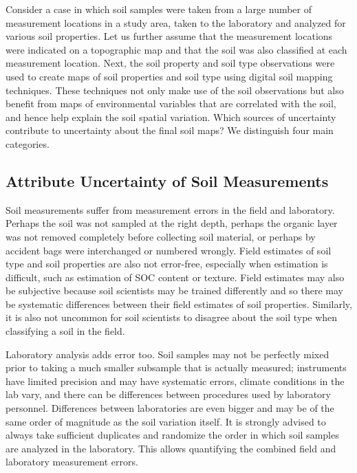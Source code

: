 \documentclass[10pt,b5paper,]{book}
\theoremstyle{definition}
\theoremstyle{definition}
\theoremstyle{definition}
\theoremstyle{remark}
\begin{document}
Consider a case in which soil samples were taken from a large number of
measurement locations in a study area, taken to the laboratory and
analyzed for various soil properties. Let us further assume that the
measurement locations were indicated on a topographic map and that the
soil was also classified at each measurement location. Next, the soil
property and soil type observations were used to create maps of soil
properties and soil type using digital soil mapping techniques. These
techniques not only make use of the soil observations but also benefit
from maps of environmental variables that are correlated with the soil,
and hence help explain the soil spatial variation. Which sources of
uncertainty contribute to uncertainty about the final soil maps? We
distinguish four main categories.

\hypertarget{attribute-uncertainty-of-soil-measurements}{%
\subsection{Attribute Uncertainty of Soil
Measurements}\label{attribute-uncertainty-of-soil-measurements}}

Soil measurements suffer from measurement errors in the field and
laboratory. Perhaps the soil was not sampled at the right depth, perhaps
the organic layer was not removed completely before collecting soil
material, or perhaps by accident bags were interchanged or numbered
wrongly. Field estimates of soil type and soil properties are also not
error-free, especially when estimation is difficult, such as estimation
of SOC content or texture. Field estimates may also be subjective
because soil scientists may be trained differently and so there may be
systematic differences between their field estimates of soil properties.
Similarly, it is also not uncommon for soil scientists to disagree about
the soil type when classifying a soil in the field.

Laboratory analysis adds error too. Soil samples may not be perfectly
mixed prior to taking a much smaller subsample that is actually
measured; instruments have limited precision and may have systematic
errors, climate conditions in the lab vary, and there can be differences
between procedures used by laboratory personnel. Differences between
laboratories are even bigger and may be of the same order of magnitude
as the soil variation itself. It is strongly advised to always take
sufficient duplicates and randomize the order in which soil samples are
analyzed in the laboratory. This allows quantifying the combined field
and laboratory measurement errors.
\end{document}
